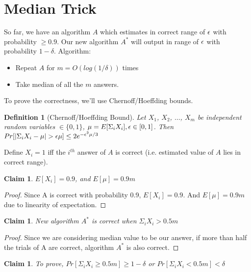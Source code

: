 \documentclass[11pt]{article}
\newtheorem{definition}[theorem]{Definition}
\newtheorem{claim}[theorem]{Claim}
\def\eps{\ensuremath\epsilon}
\begin{document}
\section{Median Trick}
So far, we have an algorithm $A$ which estimates in correct range of $\eps$ with probability $\ge 0.9$. Our new algorithm $A^{\ast}$ will output in range of $\eps$ with probability $1-\delta$.
Algorithm:
\begin{itemize}
\item Repeat $A$ for $m=O(log (1/\delta))$ times
\item Take median of all the $m$ answers.
\end{itemize}

To prove the correctness, we'll use Chernoff/Hoeffding bounds.

\begin{definition}
[Chernoff/Hoeffding Bound]
Let $X_{1}$, $X_{2}$, $\ldots$, $X_{m}$ be independent random variables $\in \{0,1\}$,
$\mu = E[\Sigma_{i} X_{i}], \eps \in [0,1]$.
Then $Pr[|\Sigma_{i} X_{i}-\mu| > \eps\mu] \leq 2e^{-\eps^{2}\mu/3}$
\end{definition}

Define $X_{i} = 1$ iff the $i^{th}$ answer of $A$ is correct (i.e. estimated value of $A$ lies in correct range).

\begin{claim}
$E[X_{i}] = 0.9$, and $E[\mu] = 0.9m$
\end{claim}

\begin{proof}
Since A is correct with probability 0.9, $E[X_{i}] = 0.9$. And $E[\mu] = 0.9m$ due to linearity of expectation.
\end{proof}

\begin{claim}
New algorithm $A^{\ast}$ is correct when $\Sigma_{i} X_{i} > 0.5m$
\end{claim}

\begin{proof}
Since we are considering median value to be our answer, if more than half the trials of A are correct, algorithm $A^{\ast}$ is also correct.
\end{proof}

\begin{claim}
To prove, $Pr[\Sigma_{i} X_{i} \ge 0.5m] \ge 1-\delta$ or $Pr[\Sigma_{i} X_{i} < 0.5m] < \delta$
\end{claim}
\end{document}
